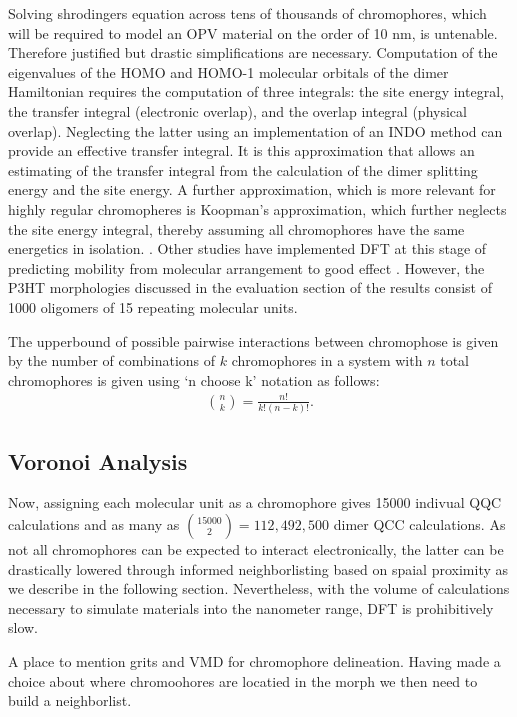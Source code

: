 Solving shrodingers equation across tens of thousands of 
chromophores, which will be required to model an OPV material on the order of 10 nm, is untenable. Therefore
justified but drastic simplifications are necessary. Computation of the eigenvalues of the HOMO and HOMO-1
molecular orbitals of the dimer Hamiltonian requires the computation of three integrals: 
the site energy integral, the transfer integral (electronic overlap), and the overlap integral (physical
overlap). Neglecting the latter using an implementation of an INDO method can provide an effective transfer
integral. It is this approximation that allows an estimating of the transfer integral from the calculation of
the dimer splitting energy and the site energy. A further approximation, which is more relevant for highly regular chromopheres is Koopman's
approximation, which further neglects the site energy integral, thereby assuming all chromophores have the same
energetics in isolation.  \cite{Huang2005b}. Other studies have implemented DFT at this stage of predicting
mobility from molecular arrangement to good effect \cite{Deng2004}. However, the P3HT morphologies discussed in the evaluation section of the results
consist of 1000 oligomers of 15 repeating molecular units. 

The upperbound of possible pairwise interactions between chromophose is given by the number of combinations of
$k$ chromophores in a system with $n$ total chromophores is given using `n choose k' notation as follows:
\begin{align}
    {n \choose k} =  \frac{n!}{k!(n-k)!}.
\end{align}

\subsection{Voronoi Analysis}

Now, assigning each molecular unit as a chromophore
gives 15000 indivual QQC calculations and as many as ${15000 \choose 2} = 112,492,500$
dimer QCC calculations. As not all chromophores can be expected to interact electronically,
the latter can be drastically lowered through informed neighborlisting based on spaial proximity as we describe
in the following section. Nevertheless, with the volume of calculations necessary to simulate materials into the
nanometer range, DFT is prohibitively slow. 


A place to mention grits and VMD for chromophore delineation. Having made a choice about where chromoohores
are locatied in the morph we then need to build a neighborlist. 



